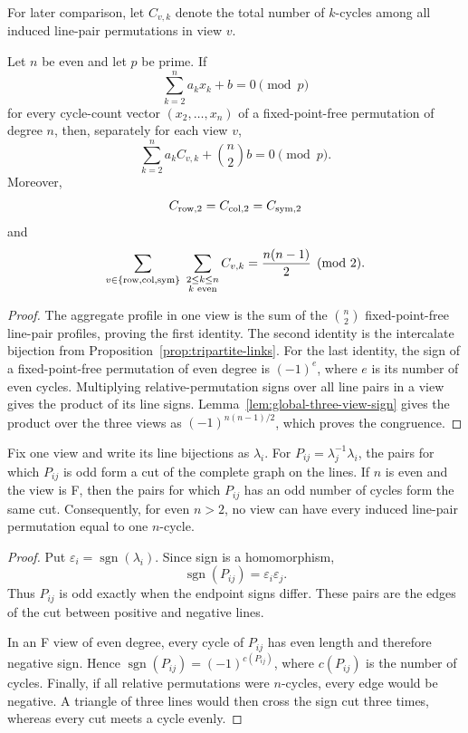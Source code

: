 For later comparison, let $C_{v,k}$ denote the total number of $k$-cycles
among all induced line-pair permutations in view $v$.

\begin{proposition}
\label{prop:aggregate-profile-baseline}
Let $n$ be even and let $p$ be prime.  If
\[
 \sum_{k=2}^n a_kx_k+b=0\pmod p
\]
for every cycle-count vector $(x_2,\ldots,x_n)$ of a fixed-point-free
permutation of degree $n$, then, separately for each view $v$,
\[
 \sum_{k=2}^n a_k C_{v,k}+\binom n2 b=0\pmod p.
\]
Moreover,
\[
 C_{\mathrm{row},2}=C_{\mathrm{col},2}=C_{\mathrm{sym},2}
\]
and
\[
 \sum_{v\in\{\rowv,\colv,\symv\}}\ \sum_{\substack{2\leq k\leq n\\k\text{ even}}}
 C_{v,k}=\frac{n(n-1)}2\pmod2.
\]
\end{proposition}

\begin{proof}
The aggregate profile in one view is the sum of the
$\binom n2$ fixed-point-free line-pair profiles, proving the first identity.
The second identity is the intercalate bijection from
Proposition~\ref{prop:tripartite-links}.  For the last identity, the sign of
a fixed-point-free permutation of even degree is $(-1)^e$, where $e$ is its
number of even cycles.  Multiplying relative-permutation signs over all line
pairs in a view gives the product of its line signs.
Lemma~\ref{lem:global-three-view-sign} gives the product over the three views as
$(-1)^{n(n-1)/2}$, which proves the congruence.
\end{proof}

\begin{proposition}\label{prop:line-sign-cut}
Fix one view and write its line bijections as $\lambda_i$.  For
$P_{ij}=\lambda_j^{-1}\lambda_i$, the pairs for which $P_{ij}$ is odd form
a cut of the complete graph on the lines.  If $n$ is even and the view is
F, then the pairs for which $P_{ij}$ has an odd number of cycles form the
same cut.  Consequently, for even $n>2$, no view can have every induced
line-pair permutation equal to one $n$-cycle.
\end{proposition}

\begin{proof}
Put $\varepsilon_i=\operatorname{sgn}(\lambda_i)$.  Since sign is a
homomorphism,
\[
 \operatorname{sgn}(P_{ij})=\varepsilon_i\varepsilon_j.
\]
Thus $P_{ij}$ is odd exactly when the endpoint signs differ.  These pairs
are the edges of the cut between positive and negative lines.

In an F view of even degree, every cycle of $P_{ij}$ has even length and
therefore negative sign.  Hence
$\operatorname{sgn}(P_{ij})=(-1)^{c(P_{ij})}$, where $c(P_{ij})$ is the
number of cycles.  Finally, if all relative permutations were $n$-cycles,
every edge would be negative.  A triangle of three lines would then cross
the sign cut three times, whereas every cut meets a cycle evenly.
\end{proof}

